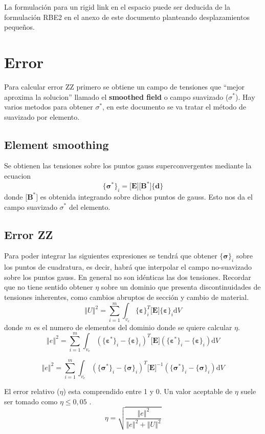 \documentclass[11pt, a4paper,titlepage]{article}
\newcommand{\vvert}[1]{\left\Vert #1\right\Vert}
\newcommand{\di}{\textrm{d}}
\newcommand{\sigmab}{\boldsymbol{\sigma}}
\newcommand{\varepsilonb}{\boldsymbol{\varepsilon}}
\newcommand{\Mme}[1]{\boldsymbol{[}\mathbf{#1} \boldsymbol{]}}
\newcommand{\Cme}[1]{\boldsymbol{\{ }\mathbf{#1} \boldsymbol{\}} }
\newcommand{\ME}{\Mme{E}}
\begin{document}
La formulación para un rigid link en el espacio puede ser deducida de la formulación RBE2 en el anexo de este documento planteando desplazamientos pequeños.

\section{Error}

Para calcular error ZZ primero se obtiene un campo de tensiones que ``mejor aproxima la solucion''{} llamado el \textbf{smoothed field} o campo suavizado ($\sigma^*$). Hay varios metodos para obtener $\sigma^*$, en este documento se va tratar el método de suavizado por elemento.

\subsection*{Element smoothing}
Se obtienen las tensiones sobre los puntos gauss superconvergentes mediante la ecuacion
\[
 \Cme{\sigmab^*}_i = \Mme{E} \Mme{B^*} \Cme{d}
\]
donde $\Mme{B^*}$ es obtenida integrando sobre dichos puntos de gauss. Esto nos da el campo suavizado $\sigma^*$ del elemento. 

\subsection*{Error ZZ}
Para poder integrar las siguientes expresiones se tendrá que obtener $\Cme{\sigmab}_i$ sobre los puntos de cuadratura, es decir, habrá que interpolar el campo no-suavizado sobre los puntos gauss. En general no son idénticas las dos tensiones. Recordar que no tiene sentido obtener $\eta$ sobre un dominio que presenta discontinuidades de tensiones inherentes, como cambios abruptos de sección y cambio de material.
\[
\vvert{U}^2 = \sum^m_{i=1}\int_{v_e} \Cme{\varepsilonb}_i^T \ME \Cme{\varepsilonb}_i \di V
\]
donde $m$ es el numero de elementos del dominio donde se quiere calcular $\eta$.
\[
\vvert{e}^2=\sum_{i=1}^m \int_{v_e} \left( \Cme{\varepsilonb^*}_i - \Cme{\varepsilonb}_i\right)^T \ME \left( \Cme{\varepsilonb^*}_i - \Cme{\varepsilonb}_i\right) \di V
\]

\[
\vvert{e}^2=\sum_{i=1}^m \int_{v_e} \left( \Cme{\sigmab^*}_i - \Cme{\sigmab}_i\right)^T \ME ^{-1} \left( \Cme{\sigmab^*}_i - \Cme{\sigmab}_i\right) \di V
\]

El error relativo ($\eta$) esta comprendido entre 1 y 0. Un valor aceptable de $\eta$ suele ser tomado como $\eta\leq 0,05$ \citep{cook2007concepts}.
\[
\eta = \sqrt{\frac{\vvert{e}^2}{\vvert{e}^2+\vvert{U}^2}}
\]
\end{document}
